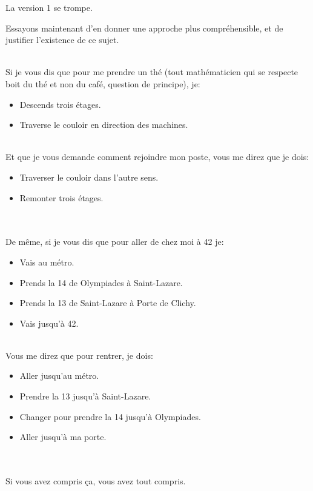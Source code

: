 \documentclass{42}
\begin{document}
\hint
{
	La version 1 se trompe.
}
\begin{flushleft}
Essayons maintenant d'en donner une approche plus compréhensible, et de justifier l'existence de ce sujet.

~\\
Si je vous dis que pour me prendre un thé (tout mathématicien qui se respecte boit du thé et non du café, question de principe), je:
\newline
\begin{itemize}
	\item Descends trois étages.
	\item Traverse le couloir en direction des machines.
\end{itemize}
~\\
Et que je vous demande comment rejoindre mon poste, vous me direz que je dois:
\newline
\begin{itemize}
	\item Traverser le couloir dans l'autre sens.
	\item Remonter trois étages.
\end{itemize}
~\\
~\\
De même, si je vous dis que pour aller de chez moi à 42 je:
\newline
\begin{itemize}
	\item Vais au métro.
	\item Prends la 14 de Olympiades à Saint-Lazare.
	\item Prends la 13 de Saint-Lazare à Porte de Clichy.
	\item Vais jusqu'à 42.
\end{itemize}
~\\
Vous me direz que pour rentrer, je dois:
\newline
\begin{itemize}
	\item Aller jusqu'au métro.
	\item Prendre la 13 jusqu'à Saint-Lazare.
	\item Changer pour prendre la 14 jusqu'à Olympiades.
	\item Aller jusqu'à ma porte.
\end{itemize}

~\\
~\\
Si vous avez compris ça, vous avez tout compris.
\end{flushleft}
\end{document}
